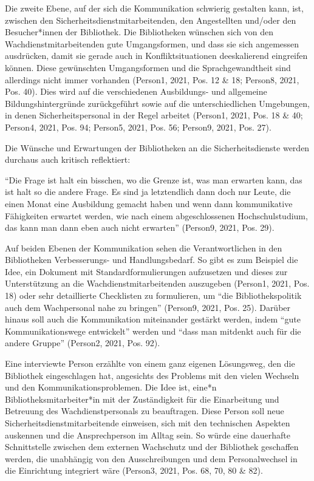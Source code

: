 \documentclass[a4paper,
fontsize=11pt,
oneside,
numbers=noperiodatend,
parskip=half-,
bibliography=totoc,
final
]{scrartcl}
\begin{document}
Die zweite Ebene, auf der sich die Kommunikation schwierig gestalten
kann, ist, zwischen den Sicherheitsdienstmitarbeitenden, den
Angestellten und/oder den Besucher*innen der Bibliothek. Die
Bibliotheken wünschen sich von den Wachdienstmitarbeitenden gute
Umgangsformen, und dass sie sich angemessen ausdrücken, damit sie gerade
auch in Konfliktsituationen deeskalierend eingreifen können. Diese
gewünschten Umgangsformen und die Sprachgewandtheit sind allerdings
nicht immer vorhanden (Person1, 2021, Pos. 12 \& 18; Person8, 2021, Pos.
40). Dies wird auf die verschiedenen Ausbildungs- und allgemeine
Bildungshintergründe zurückgeführt sowie auf die unterschiedlichen
Umgebungen, in denen Sicherheitspersonal in der Regel arbeitet (Person1,
2021, Pos. 18 \& 40; Person4, 2021, Pos. 94; Person5, 2021, Pos. 56;
Person9, 2021, Pos. 27).

Die Wünsche und Erwartungen der Bibliotheken an die Sicherheitsdienste
werden durchaus auch kritisch reflektiert:

\begin{flushright}
\enquote{Die Frage ist halt ein bisschen, wo die Grenze ist, was man
erwarten kann, das ist halt so die andere Frage. Es sind ja letztendlich
dann doch nur Leute, die einen Monat eine Ausbildung gemacht haben und
wenn dann kommunikative Fähigkeiten erwartet werden, wie nach einem
abgeschlossenen Hochschulstudium, das kann man dann eben auch nicht
erwarten} \linebreak(Person9, 2021, Pos. 29).
\end{flushright}

Auf beiden Ebenen der Kommunikation sehen die Verantwortlichen in den
Bibliotheken Ver\-bes\-se\-rungs- und Handlungsbedarf. So gibt es zum Beispiel
die Idee, ein Dokument mit Standardformulierungen aufzusetzen und dieses
zur Unterstützung an die Wachdienstmitarbeitenden auszugeben (Person1,
2021, Pos. 18) oder sehr detaillierte Checklisten zu formulieren, um
\enquote{die Bibliothekspolitik auch dem Wachpersonal nahe zu bringen}
(Person9, 2021, Pos. 25). Darüber hinaus soll auch die Kommunikation
miteinander gestärkt werden, indem \enquote{gute Kommunikationswege
entwickelt} werden und \enquote{dass man mitdenkt auch für die andere
Gruppe} (Person2, 2021, Pos. 92).

Eine interviewte Person erzählte von einem ganz eigenen Lösungsweg, den
die Bibliothek eingeschlagen hat, angesichts des Problems mit den vielen
Wechseln und den Kommunikationsproblemen. Die Idee ist, eine*n
Bibliotheksmitarbeiter*in mit der Zuständigkeit für die Einarbeitung und
Betreuung des Wachdienstpersonals zu beauftragen. Diese Person soll neue
Sicherheitsdienstmitarbeitende einweisen, sich mit den technischen
Aspekten auskennen und die Ansprechperson im Alltag sein. So würde eine
dauerhafte Schnittstelle zwischen dem externen Wachschutz und der
Bibliothek geschaffen werden, die unabhängig von den Ausschreibungen und
dem Personalwechsel in die Einrichtung integriert wäre (Person3, 2021,
Pos. 68, 70, 80 \& 82).
\end{document}
